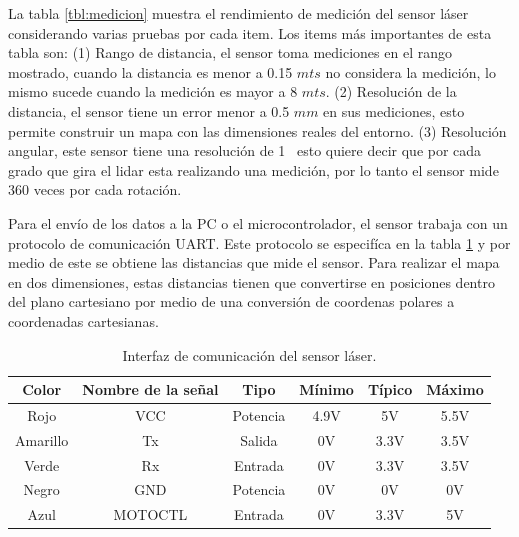 La tabla \ref{tbl:medicion} muestra el rendimiento de medici\'on del 
sensor l\'aser \cite{Slamtec} considerando varias pruebas por cada item. Los items más 
importantes de esta tabla son: (1) Rango de distancia, el sensor toma mediciones en el
rango mostrado, cuando la distancia es menor a 0.15 $mts$ no considera la medición, lo 
mismo sucede cuando la medición es mayor a 8 $mts$. (2) Resolución de la distancia, el 
sensor tiene un error menor a 0.5 $mm$ en sus mediciones, esto permite construir un mapa 
con las dimensiones reales del entorno. (3) Resolución angular, este sensor tiene una 
resolución de 1\grad~ esto quiere decir que por cada grado que gira el lidar esta 
realizando una medición, por lo tanto el sensor mide 360 veces por cada rotación.

Para el envío de los datos a la PC o el microcontrolador, el sensor trabaja con un protocolo
de comunicación UART. Este protocolo se especifíca en la tabla \ref{tbl:comunicacion} y 
por medio de este se obtiene las distancias que mide el sensor. Para realizar el mapa en 
dos dimensiones, estas distancias tienen que convertirse en posiciones dentro del plano 
cartesiano por medio de una conversión de coordenas polares a coordenadas cartesianas.
\begin{table}[htbp]
\begin{center}
\begin{tabular}{|c|c|c|c|c|c|}
\hline
Color & Nombre de la se\~nal & Tipo & M\'inimo & T\'ipico & M\'aximo \\ 
\hline \hline
Rojo & VCC & Potencia & 4.9V & 5V & 5.5V \\ \hline
Amarillo & Tx & Salida & 0V & 3.3V & 3.5V \\ \hline
Verde & Rx & Entrada & 0V & 3.3V & 3.5V \\ \hline
Negro & GND & Potencia & 0V & 0V & 0V \\ \hline
Azul & MOTOCTL & Entrada & 0V & 3.3V & 5V \\ \hline
\end{tabular}
\caption{Interfaz de comunicaci\'on del sensor l\'aser.}
\label{tbl:comunicacion}
\end{center}
\end{table}

